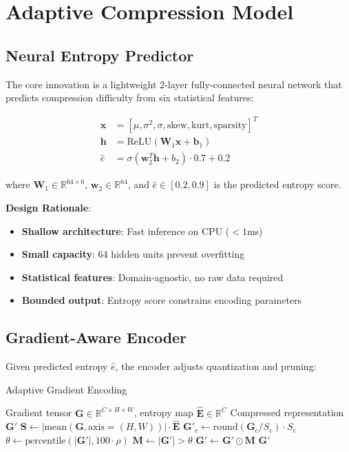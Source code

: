 \documentclass[11pt,twocolumn]{article}
\begin{document}
\section{Adaptive Compression Model}

\subsection{Neural Entropy Predictor}

The core innovation is a lightweight 2-layer fully-connected neural network that predicts compression difficulty from six statistical features:

\begin{align}
\mathbf{x} &= [\mu, \sigma^2, \sigma, \text{skew}, \text{kurt}, \text{sparsity}]^T \\
\mathbf{h} &= \text{ReLU}(\mathbf{W}_1 \mathbf{x} + \mathbf{b}_1) \\
\hat{e} &= \sigma(\mathbf{w}_2^T \mathbf{h} + b_2) \cdot 0.7 + 0.2
\end{align}

where $\mathbf{W}_1 \in \mathbb{R}^{64 \times 6}$, $\mathbf{w}_2 \in \mathbb{R}^{64}$, and $\hat{e} \in [0.2, 0.9]$ is the predicted entropy score.

\textbf{Design Rationale}:
\begin{itemize}
    \item \textbf{Shallow architecture}: Fast inference on CPU ($< 1$ms)
    \item \textbf{Small capacity}: 64 hidden units prevent overfitting
    \item \textbf{Statistical features}: Domain-agnostic, no raw data required
    \item \textbf{Bounded output}: Entropy score constrains encoding parameters
\end{itemize}

\subsection{Gradient-Aware Encoder}

Given predicted entropy $\hat{e}$, the encoder adjusts quantization and pruning:

\begin{algorithm}
\caption{Adaptive Gradient Encoding}
\begin{algorithmic}[1]
\REQUIRE Gradient tensor $\mathbf{G} \in \mathbb{R}^{C \times H \times W}$, entropy map $\hat{\mathbf{E}} \in \mathbb{R}^C$
\ENSURE Compressed representation $\mathbf{G}'$
\STATE $\mathbf{S} \leftarrow |\text{mean}(\mathbf{G}, \text{axis}=(H,W))| \cdot \hat{\mathbf{E}}$ 
    \STATE $\mathbf{G}'_c \leftarrow \text{round}(\mathbf{G}_c / S_c) \cdot S_c$ 
\ENDFOR
\STATE $\theta \leftarrow \text{percentile}(|\mathbf{G}'|, 100 \cdot \rho)$ 
\STATE $\mathbf{M} \leftarrow |\mathbf{G}'| > \theta$ 
\STATE $\mathbf{G}' \leftarrow \mathbf{G}' \odot \mathbf{M}$ 
\RETURN $\mathbf{G}'$
\end{algorithmic}
\end{algorithm}
\end{document}
